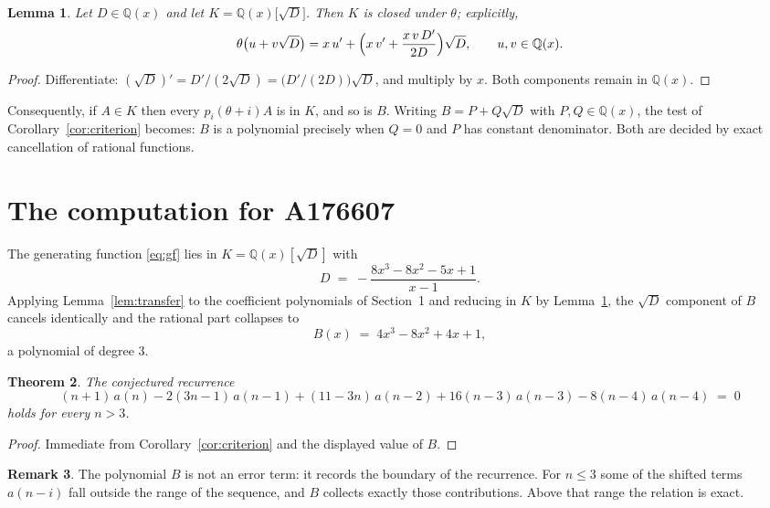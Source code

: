 \documentclass[11pt,a4paper]{article}
\theoremstyle{plain}
\newtheorem{theorem}{Theorem}
\newtheorem{lemma}[theorem]{Lemma}
\theoremstyle{definition}
\newtheorem{remark}[theorem]{Remark}
\begin{document}
\begin{lemma}\label{lem:field}
Let $D\in\mathbb{Q}(x)$ and let $K=\mathbb{Q}(x)\bigl[\sqrt{D}\bigr]$. Then $K$ is closed
under $\theta$; explicitly,
\[
\theta\bigl(u+v\sqrt{D}\bigr)=x\,u'+\Bigl(x\,v'+\frac{x\,v\,D'}{2D}\Bigr)\sqrt{D},
\qquad u,v\in\mathbb{Q}(x).
\]
\end{lemma}

\begin{proof}
Differentiate: $(\sqrt{D})'=D'/(2\sqrt{D})=\bigl(D'/(2D)\bigr)\sqrt{D}$, and multiply by
$x$. Both components remain in $\mathbb{Q}(x)$.
\end{proof}

Consequently, if $A\in K$ then every $p_{i}(\theta+i)A$ is in $K$, and so is $B$. Writing
$B=P+Q\sqrt{D}$ with $P,Q\in\mathbb{Q}(x)$, the test of Corollary~\ref{cor:criterion}
becomes: $B$ is a polynomial precisely when $Q=0$ and $P$ has constant denominator. Both
are decided by exact cancellation of rational functions.

\section{The computation for A176607}

The generating function \eqref{eq:gf} lies in $K=\mathbb{Q}(x)[\sqrt{D}]$ with
\[
D \;=\; - \frac{8 x^{3} - 8 x^{2} - 5 x + 1}{x - 1} .
\]
Applying Lemma~\ref{lem:transfer} to the coefficient polynomials of Section~1 and reducing
in $K$ by Lemma~\ref{lem:field}, the $\sqrt{D}$ component of $B$ cancels identically and
the rational part collapses to
\[
B(x)\;=\;4 x^{3} - 8 x^{2} + 4 x + 1 ,
\]
a polynomial of degree $3$.

\begin{theorem}
The conjectured recurrence
\[
(n + 1)\,a(n) -  2 \left(3 n - 1\right)\,a(n-1) + (11 - 3 n)\,a(n-2) + 16 \left(n - 3\right)\,a(n-3) -  8 \left(n - 4\right)\,a(n-4) \;=\;0
\]
holds for every $n>3$.
\end{theorem}

\begin{proof}
Immediate from Corollary~\ref{cor:criterion} and the displayed value of $B$.
\end{proof}

\begin{remark}
The polynomial $B$ is not an error term: it records the boundary of the recurrence. For
$n\le3$ some of the shifted terms $a(n-i)$ fall outside the range of the sequence,
and $B$ collects exactly those contributions. Above that range the relation is exact.
\end{remark}
\end{document}
